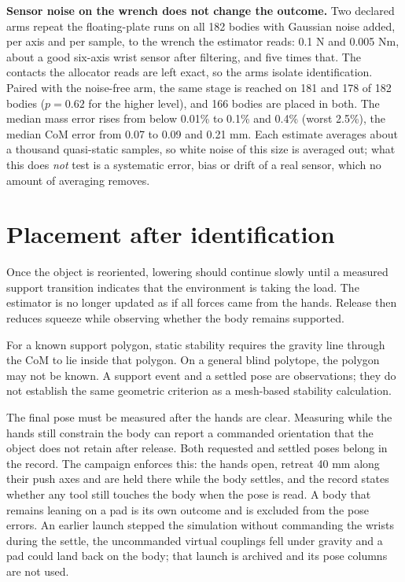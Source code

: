 \textbf{Sensor noise on the wrench does not change the outcome.} Two declared arms repeat the floating-plate runs on all 182 bodies with Gaussian noise added, per axis and per sample, to the wrench the estimator reads: 0.1 N and 0.005 Nm, about a good six-axis wrist sensor after filtering, and five times that. The contacts the allocator reads are left exact, so the arms isolate identification. Paired with the noise-free arm, the same stage is reached on 181 and 178 of 182 bodies ($p=0.62$ for the higher level), and 166 bodies are placed in both. The median mass error rises from below 0.01\% to 0.1\% and 0.4\% (worst 2.5\%), the median CoM error from 0.07 to 0.09 and 0.21 mm. Each estimate averages about a thousand quasi-static samples, so white noise of this size is averaged out; what this does \emph{not} test is a systematic error, bias or drift of a real sensor, which no amount of averaging removes.

\section{Placement after identification}

Once the object is reoriented, lowering should continue slowly until a measured support transition indicates that the environment is taking the load. The estimator is no longer updated as if all forces came from the hands. Release then reduces squeeze while observing whether the body remains supported.

For a known support polygon, static stability requires the gravity line through the CoM to lie inside that polygon. On a general blind polytope, the polygon may not be known. A support event and a settled pose are observations; they do not establish the same geometric criterion as a mesh-based stability calculation.

The final pose must be measured after the hands are clear. Measuring while the hands still constrain the body can report a commanded orientation that the object does not retain after release. Both requested and settled poses belong in the record. The campaign enforces this: the hands open, retreat 40 mm along their push axes and are held there while the body settles, and the record states whether any tool still touches the body when the pose is read. A body that remains leaning on a pad is its own outcome and is excluded from the pose errors. An earlier launch stepped the simulation without commanding the wrists during the settle, the uncommanded virtual couplings fell under gravity and a pad could land back on the body; that launch is archived and its pose columns are not used.

